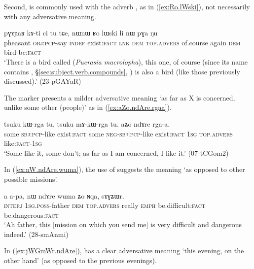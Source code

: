 Second,  is commonly used with the adverb , as in (\ref{ex:Ro.lWski}), not necessarily with any adversative meaning.

\begin{exe}
\ex \label{ex:Ro.lWski}
\gll  pɣɤɲaʁ kɤ-ti ci tu tɕe, nɯnɯ ʁo lɯski li nɯ pɣa ŋu \\
pheasant \textsc{obj}:\textsc{pcp}-say \textsc{indef} exist:\textsc{fact} \textsc{lnk} \textsc{dem} \textsc{top}.\textsc{advers} of.course again \textsc{dem} bird be:\textsc{fact} \\
\glt `There is a bird called  (\textit{Pucrasia macrolopha}), this one, of course (since its name contains , §\ref{sec:subject.verb.compounds}, ) is also a bird (like those previously discussed).' (23-pGAYaR)
\end{exe}

The marker  presents a milder adversative meaning `as far as X is concerned, unlike some other (people)' as in (\ref{ex:aZo.ndAre.rgaa}).  

\begin{exe}
\ex \label{ex:aZo.ndAre.rgaa}
\gll tsuku kɯ-rga tu, tsuku mɤ-kɯ-rga tu. aʑo ndɤre rga-a. \\
some \textsc{sbj}:\textsc{pcp}-like exist:\textsc{fact} some \textsc{neg}-\textsc{sbj}:\textsc{pcp}-like exist:\textsc{fact} \textsc{1sg} \textsc{top}.\textsc{advers} like:\textsc{fact}-\textsc{1sg} \\
\glt `Some like it, some don't; as far as I am concerned, I like it.' (07-tCGom2) 
\end{exe}

In (\ref{ex:nW.ndAre.wuma}), the use of  suggests the meaning `as opposed to other possible missions'.

\begin{exe}
\ex \label{ex:nW.ndAre.wuma}
\gll a a-pa, nɯ ndɤre wuma ʑo ɴqa, sɤɣʑɯr. \\
\textsc{interj} \textsc{1sg}.\textsc{poss}-father \textsc{dem} \textsc{top}.\textsc{advers} really \textsc{emph} be.difficult:\textsc{fact} be.dangerous:\textsc{fact} \\
\glt `Ah father, this [mission on which you send me] is very difficult and dangerous indeed.' (28-smAnmi)
\end{exe}

In (\ref{ex:jWGmWr.ndAre}),  has a clear adversative meaning `this evening, on the other hand' (as opposed to the previous evenings).

